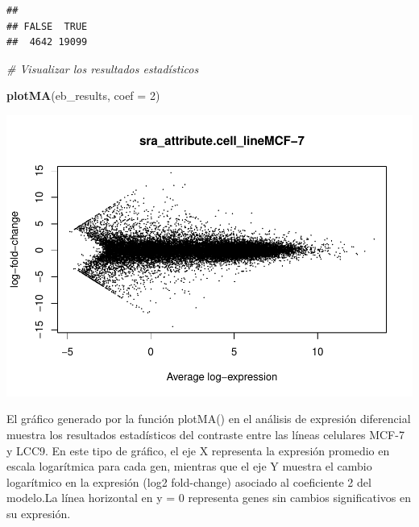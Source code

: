 \documentclass[
]{article}
\newenvironment{Shaded}{\begin{snugshade}}{\end{snugshade}}
\newcommand{\AttributeTok}[1]{\textcolor[rgb]{0.13,0.29,0.53}{#1}}
\newcommand{\CommentTok}[1]{\textcolor[rgb]{0.56,0.35,0.01}{\textit{#1}}}
\newcommand{\DecValTok}[1]{\textcolor[rgb]{0.00,0.00,0.81}{#1}}
\newcommand{\FunctionTok}[1]{\textcolor[rgb]{0.13,0.29,0.53}{\textbf{#1}}}
\newcommand{\NormalTok}[1]{#1}
\newcommand{\SpecialCharTok}[1]{\textcolor[rgb]{0.81,0.36,0.00}{\textbf{#1}}}
\begin{document}
\begin{verbatim}
## 
## FALSE  TRUE 
##  4642 19099
\end{verbatim}

\begin{Shaded}
\begin{Highlighting}[]
\CommentTok{\# Visualizar los resultados estadísticos}

\FunctionTok{plotMA}\NormalTok{(eb\_results, }\AttributeTok{coef =} \DecValTok{2}\NormalTok{)}
\end{Highlighting}
\end{Shaded}

\includegraphics{Proyecto_RNAseq_files/figure-latex/unnamed-chunk-14-1.pdf}

El gráfico generado por la función plotMA() en el análisis de expresión
diferencial muestra los resultados estadísticos del contraste entre las
líneas celulares MCF-7 y LCC9. En este tipo de gráfico, el eje X
representa la expresión promedio en escala logarítmica para cada gen,
mientras que el eje Y muestra el cambio logarítmico en la expresión
(log2 fold-change) asociado al coeficiente 2 del modelo.La línea
horizontal en y = 0 representa genes sin cambios significativos en su
expresión.

\begin{Shaded}
\end{Shaded}
\end{document}
